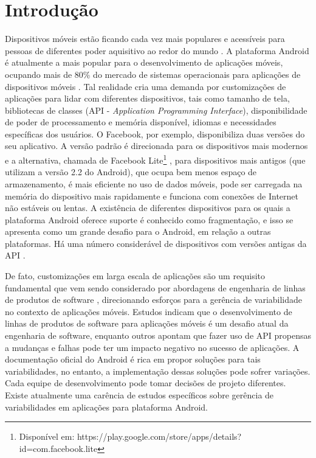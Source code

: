 \chapter{Introdução}

Dispositivos móveis estão ficando cada vez mais populares e acessíveis para
pessoas de diferentes poder aquisitivo ao redor do mundo \cite{Lhamas2014}.
A plataforma Android é atualmente a mais popular para o desenvolvimento de aplicações
móveis, ocupando mais de 80\% do mercado de sistemas operacionais para aplicações
de dispositivos móveis \cite{jim2014}. Tal realidade cria uma demanda por customizações
de aplicações para lidar com diferentes dispositivos, tais como tamanho de tela,
bibliotecas de classes (API - \textit{Application Programming Interface}),
disponibilidade de poder de processamento e memória
disponível, idiomas e necessidades específicas dos usuários. O Facebook, por exemplo,
disponibiliza duas versões do seu aplicativo. A versão padrão é direcionada para
os dispositivos mais modernos e a alternativa, chamada de
Facebook Lite\footnote{Disponível em: https://play.google.com/store/apps/details?id=com.facebook.lite}
, para dispositivos mais antigos (que utilizam a versão 2.2 do Android), que
ocupa bem menos espaço de armazenamento, é mais eficiente no uso de dados móveis,
pode ser carregada na memória do dispositivo mais rapidamente e funciona com conexões
de Internet não estáveis ou lentas. A existência de diferentes dispositivos para
os quais a plataforma Android oferece suporte é conhecido como fragmentação, e isso
se apresenta como um grande desafio para o Android, em relação a outras plataformas.
Há uma número considerável de dispositivos com versões antigas da API \cite{Gronli2014}.

De fato, customizações em larga escala de aplicações são um requisito fundamental
que vem sendo considerado por abordagens de engenharia de linhas de produtos de software
\cite{Alves2007} \cite{Alves2005}, direcionando esforços para a gerência de variabilidade
no contexto de aplicações móveis. Estudos \cite{Dehlinger2011} indicam que o desenvolvimento
de linhas de produtos de software para aplicações móveis é um desafio atual da
engenharia de software, enquanto outros \cite{Linares-Vasquez2013}
apontam que fazer uso de API propensas a mudanças e falhas pode ter um impacto
negativo no sucesso de aplicações. A documentação oficial do Android \cite{GuiaAndroid}
é rica em propor soluções para tais variabilidades, no entanto, a implementação
dessas soluções pode sofrer variações. Cada equipe de desenvolvimento pode tomar
decisões de projeto diferentes. Existe atualmente uma carência de estudos
específicos sobre gerência de variabilidades em aplicações para plataforma Android.

